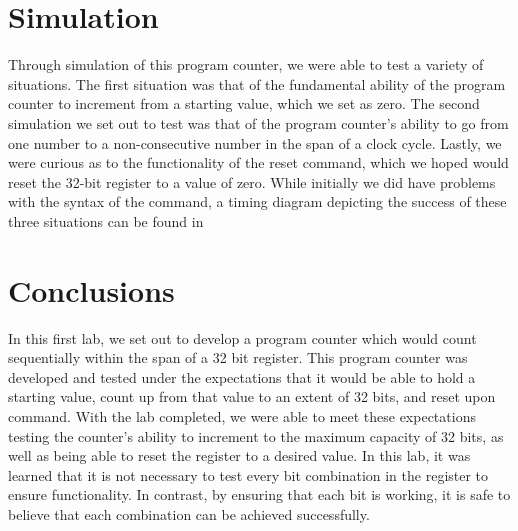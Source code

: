 \documentclass{article}
\newcommand{\Verilog}[3]{
  \lstset{language=Verilog}
  \lstset{backgroundcolor=\color{listinggray},rulecolor=\color{blue}}
  \lstset{linewidth=\textwidth}
  \lstset{commentstyle=\textit, stringstyle=\upshape,showspaces=false}
  \lstset{frame=tb}
  
}
\begin{document}

\section{Simulation}
Through simulation of this program counter, we were able to test a variety of situations. The first situation was that of the fundamental ability of the program counter to increment from a starting value, which we set as zero.
The second simulation we set out to test was that of the program counter's ability to go from one number to a non-consecutive number in the span of a clock cycle.
Lastly, we were curious as to the functionality of the reset command, which we hoped would reset the 32-bit register to a value of zero. While initially we did have problems with the syntax of the command, a timing diagram depicting the success of these three situations can be found in %


\begin{figure}
	\begin{center}
	\end{center}
\end{figure}


\section{Conclusions}
In this first lab, we set out to develop a program counter which would count sequentially within the span of a 32 bit register. This program counter was developed and tested under the expectations that it would be able to hold a starting value, count up from that value to an extent of 32 bits, and reset upon command. With the lab completed, we were able to meet these expectations testing the counter's ability to increment to the maximum capacity of 32 bits, as well as being able to reset the register to a desired value. In this lab, it was learned that it is not necessary to test every bit combination in the register to ensure functionality. In contrast, by ensuring that each bit is working, it is safe to believe that each combination can be achieved successfully.
\end{document}
